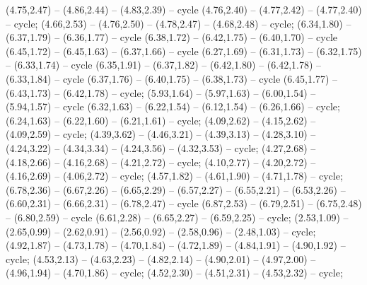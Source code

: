 { (4.75,2.47) -- (4.86,2.44) -- (4.83,2.39) -- cycle (4.76,2.40) -- (4.77,2.42) -- (4.77,2.40) -- cycle;
 (4.66,2.53) -- (4.76,2.50) -- (4.78,2.47) -- (4.68,2.48) -- cycle;
 (6.34,1.80) -- (6.37,1.79) -- (6.36,1.77) -- cycle (6.38,1.72) -- (6.42,1.75) -- (6.40,1.70) -- cycle (6.45,1.72) -- (6.45,1.63) -- (6.37,1.66) -- cycle (6.27,1.69) -- (6.31,1.73) -- (6.32,1.75) -- (6.33,1.74) -- cycle (6.35,1.91) -- (6.37,1.82) -- (6.42,1.80) -- (6.42,1.78) -- (6.33,1.84) -- cycle (6.37,1.76) -- (6.40,1.75) -- (6.38,1.73) -- cycle (6.45,1.77) -- (6.43,1.73) -- (6.42,1.78) -- cycle;
 (5.93,1.64) -- (5.97,1.63) -- (6.00,1.54) -- (5.94,1.57) -- cycle (6.32,1.63) -- (6.22,1.54) -- (6.12,1.54) -- (6.26,1.66) -- cycle;
 (6.24,1.63) -- (6.22,1.60) -- (6.21,1.61) -- cycle;
 (4.09,2.62) -- (4.15,2.62) -- (4.09,2.59) -- cycle;
 (4.39,3.62) -- (4.46,3.21) -- (4.39,3.13) -- (4.28,3.10) -- (4.24,3.22) -- (4.34,3.34) -- (4.24,3.56) -- (4.32,3.53) -- cycle;
 (4.27,2.68) -- (4.18,2.66) -- (4.16,2.68) -- (4.21,2.72) -- cycle;
 (4.10,2.77) -- (4.20,2.72) -- (4.16,2.69) -- (4.06,2.72) -- cycle;
 (4.57,1.82) -- (4.61,1.90) -- (4.71,1.78) -- cycle;
 (6.78,2.36) -- (6.67,2.26) -- (6.65,2.29) -- (6.57,2.27) -- (6.55,2.21) -- (6.53,2.26) -- (6.60,2.31) -- (6.66,2.31) -- (6.78,2.47) -- cycle (6.87,2.53) -- (6.79,2.51) -- (6.75,2.48) -- (6.80,2.59) -- cycle (6.61,2.28) -- (6.65,2.27) -- (6.59,2.25) -- cycle;
 (2.53,1.09) -- (2.65,0.99) -- (2.62,0.91) -- (2.56,0.92) -- (2.58,0.96) -- (2.48,1.03) -- cycle;
 (4.92,1.87) -- (4.73,1.78) -- (4.70,1.84) -- (4.72,1.89) -- (4.84,1.91) -- (4.90,1.92) -- cycle;
 (4.53,2.13) -- (4.63,2.23) -- (4.82,2.14) -- (4.90,2.01) -- (4.97,2.00) -- (4.96,1.94) -- (4.70,1.86) -- cycle;
 (4.52,2.30) -- (4.51,2.31) -- (4.53,2.32) -- cycle;
}
